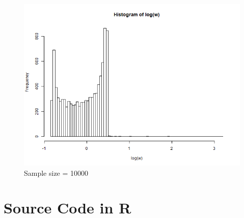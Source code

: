 \documentclass{article}
\begin{document}
{\begin{figure}[H]
        \includegraphics[width = 0.6\linewidth]{2_log_weight_10000.png}
        \caption{Sample size = 10000}
    \end{figure}
}

\section*{Source Code in R}
\end{document}
